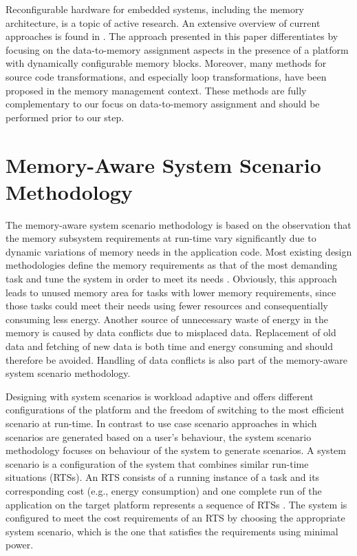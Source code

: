 \documentclass{acm_proc_article-sp}
\begin{document}
Reconfigurable hardware for embedded systems, including the memory architecture, is a topic of active research. An extensive overview of current approaches is found in \cite{Garcia}. The approach presented in this paper differentiates by focusing on the data-to-memory assignment aspects in the presence of a platform with dynamically configurable memory blocks. Moreover, many methods for source code transformations, and especially loop transformations, have been proposed in the memory management context. These methods are fully complementary to our focus on data-to-memory assignment and should be performed prior to our step. 

\section{Memory-Aware System Scenario Methodology}
\label{sec:methodology}

The memory-aware system scenario methodology is based on the observation that the memory subsystem requirements at run-time vary significantly due to dynamic variations of memory needs in the application code. Most existing design methodologies define the memory requirements as that of the most demanding task and tune the system in order to meet its needs \cite{tcm}. Obviously, this approach leads to unused memory area for tasks with lower memory requirements, since those tasks could meet their needs using fewer resources and consequentially consuming less energy. Another source of unnecessary waste of energy in the memory is caused by data conflicts due to misplaced data. Replacement of old data and fetching of new data is both time and energy consuming and should therefore be avoided. Handling of data conflicts is also part of the  memory-aware system scenario methodology.

Designing with system scenarios is workload adaptive and offers different configurations of the platform and the freedom of switching to the most efficient scenario at run-time. In contrast to use case scenario approaches in which scenarios are generated based on a user's behaviour, the system scenario methodology focuses on behaviour of the system to generate scenarios. A system scenario is a configuration of the system that combines similar run-time situations (RTSs). An RTS consists of a running instance of a task and its corresponding cost (e.g., energy consumption) and one complete run of the application on the target platform represents a sequence of RTSs \cite{Elena2010}. The system is configured to meet the cost requirements of an RTS by choosing the appropriate system scenario, which is the one that satisfies the requirements using minimal power.
\end{document}

